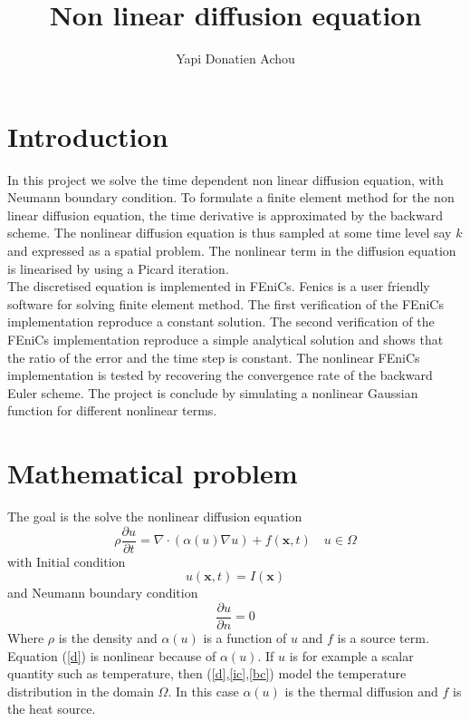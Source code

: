 \documentclass[10pt,a4paper]{report}
\author{Yapi Donatien Achou}
\title{Non linear diffusion equation}
\begin{document}
\maketitle
\section{Introduction}
In this project we solve the time dependent non linear diffusion equation, with Neumann boundary condition.
To formulate a finite element method for the non linear diffusion equation, the time derivative is approximated by the backward scheme. The nonlinear diffusion equation is thus sampled at some time level say $k$ and expressed as a spatial problem. The nonlinear term in the diffusion equation is linearised by using a Picard iteration.\\
The discretised equation is implemented in FEniCs. Fenics is a user friendly software for solving finite element method. The first verification of the FEniCs implementation reproduce a constant solution. The second verification of the FEniCs implementation reproduce a simple analytical solution and shows that the ratio of the error and the time step is constant. The nonlinear FEniCs implementation is tested by recovering the convergence rate of the backward Euler scheme. The project is conclude by simulating a nonlinear Gaussian function for different nonlinear terms.


\section{Mathematical problem}
The goal is the solve the nonlinear diffusion equation
\begin{equation}\label{d}
\rho\frac{\partial u}{\partial t} = \nabla\cdot(\alpha (u)\nabla u) + f(\textbf{x},t)\quad u\in\Omega
\end{equation}
with Initial condition
\begin{equation}\label{ic}
u(\textbf{x},t) = I(\textbf{x})
\end{equation}
and Neumann boundary condition
\begin{equation}\label{bc}
\frac{\partial u}{\partial n} = 0
\end{equation}
Where $\rho$ is the density and $\alpha (u)$ is a function of $u$ and $f$ is a source term. Equation (\ref{d}) is nonlinear because of $\alpha (u)$. If $u$ is for example a scalar quantity such as temperature, then (\ref{d},\ref{ic},\ref{bc}) model the temperature distribution in the domain $\Omega$. In this case $\alpha (u)$ is the thermal diffusion and $f$ is the heat source.
\end{document}
